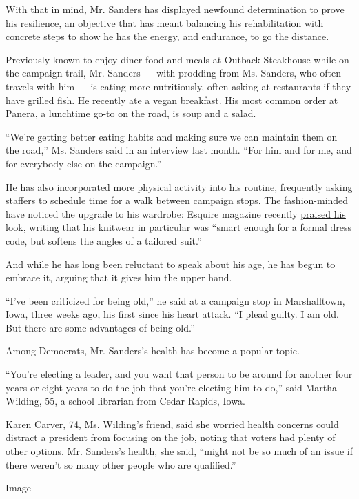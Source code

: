With that in mind, Mr. Sanders has displayed newfound determination to
prove his resilience, an objective that has meant balancing his
rehabilitation with concrete steps to show he has the energy, and
endurance, to go the distance.

Previously known to enjoy diner food and meals at Outback Steakhouse
while on the campaign trail, Mr. Sanders --- with prodding from Ms.
Sanders, who often travels with him --- is eating more nutritiously,
often asking at restaurants if they have grilled fish. He recently ate a
vegan breakfast. His most common order at Panera, a lunchtime go-to on
the road, is soup and a salad.

``We're getting better eating habits and making sure we can maintain
them on the road,'' Ms. Sanders said in an interview last month. ``For
him and for me, and for everybody else on the campaign.''

He has also incorporated more physical activity into his routine,
frequently asking staffers to schedule time for a walk between campaign
stops. The fashion-minded have noticed the upgrade to his wardrobe:
Esquire magazine recently
\href{https://www.esquire.com/uk/style/a29532336/trump-tycoon-bernie-cozy-boy-librarian-democrats-2020/}{praised
his look}, writing that his knitwear in particular was ``smart enough
for a formal dress code, but softens the angles of a tailored suit.''

And while he has long been reluctant to speak about his age, he has
begun to embrace it, arguing that it gives him the upper hand.

``I've been criticized for being old,'' he said at a campaign stop in
Marshalltown, Iowa, three weeks ago, his first since his heart attack.
``I plead guilty. I am old. But there are some advantages of being
old.''

Among Democrats, Mr. Sanders's health has become a popular topic.

``You're electing a leader, and you want that person to be around for
another four years or eight years to do the job that you're electing him
to do,'' said Martha Wilding, 55, a school librarian from Cedar Rapids,
Iowa.

Karen Carver, 74, Ms. Wilding's friend, said she worried health concerns
could distract a president from focusing on the job, noting that voters
had plenty of other options. Mr. Sanders's health, she said, ``might not
be so much of an issue if there weren't so many other people who are
qualified.''

Image

